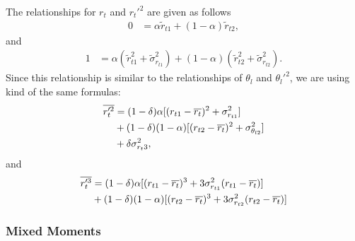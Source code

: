 The relationships for $r_t$ and $r_t'^2$ are given as follows
\begin{align}
    \label{eq:rt_bar_nondim}
    0 &= \alpha \tilde{r}_{t1} + (1 - \alpha) \tilde{r}_{t2},
\end{align}
and
\begin{align}
    \label{rtptwo_nondim}
    1 &= \alpha \left( \tilde{r}_{t1}^2 + \tilde{\sigma}_{r_{t1}}^2 \right) + (1 - \alpha) \left( \tilde{r}_{t2}^2 + \tilde{\sigma}_{r_{t2}}^2 \right).
\end{align}
Since this relationship is similar to the relationships of $\theta_l$ and $\theta_l'^2$,
we are using kind of the same formulas:
\begin{align}
    \label{eq:r_t_prime_2_bar}
    \overline{r_t'^2}
    &= (1 - \delta) \alpha [(r_{t1} - \overline{r_t})^2 + \sigma_{r_{t1}}^2] \nonumber\\
    &+ (1 - \delta) (1 - \alpha) [(r_{t2} - \overline{r_t})^2 + \sigma_{\theta_{l2}}^2] \nonumber\\
    &+ \delta \sigma_{r_t 3}^2,
\end{align}
and
\begin{align}
    \label{eq:r_t_prime_3_bar}
    \overline{r_t'^3}
    &= (1 - \delta) \alpha [(r_{t1} - \overline{r_t})^3 + 3 \sigma_{r_{t1}}^2 (r_{t1} - \overline{r_t})] \nonumber\\
    &+ (1 - \delta) (1 - \alpha) [(r_{t2} - \overline{r_t})^3 + 3 \sigma_{r_{t2}}^2 (r_{t2} - \overline{r_t})]
\end{align}

\subsubsection{Mixed Moments}\label{subsubsec:lowerordermoments_mixed}

